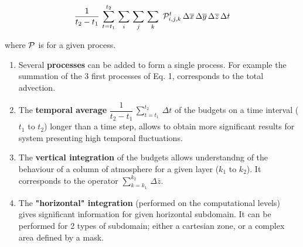 \begin{equation}
\dfrac{1}{t_2 - t_1} \,  \sum_{t=t_1}^{t_2}
 \,  \sum_{i} \,  \sum_{j} \,  \sum_{k} \,
 \, {\cal P}_{i,j,k}^{t}
 \, \Delta \overline{x} \, \Delta \overline{y} \, \Delta \overline{z}
 \, \Delta t
\end{equation}

\noindent where ${\cal P}$ is for a given process.

\begin{enumerate}
\item Several {\bf processes} can be added to form a single process. For example
the summation of the 3 first processes of Eq. 1, corresponds to the total
advection.

\item The {\bf temporal average}
$\dfrac{1}{t_2 - t_1} \,  \sum_{t=t_1}^{t_2} \, \Delta t$
of the budgets on a time interval ($t_1$ to
$t_2$) longer than a time step, allows to obtain more significant results
for system presenting high temporal fluctuations.

\item The {\bf vertical integration} of the budgets allows understandng of the
behaviour of a column of atmosphere for a given layer ($k_1$ to $k_2$).
 It corresponds to the operator $\sum_{k=k_1}^{k_2} \, \Delta \overline{z}$.

\item The {\bf "horizontal" integration} (performed on the computational levels)
gives significant information for given horizontal subdomain. It can be
performed for
2 types of subdomain; either a cartesian zone, or a complex area defined by
a mask.

\end{enumerate}


